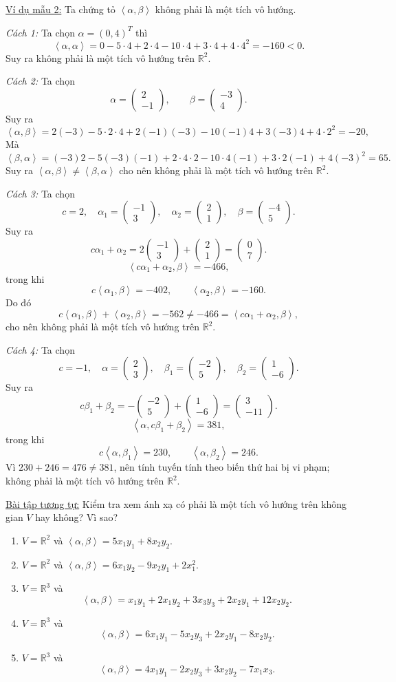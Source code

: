 \documentclass[12pt,a4paper]{article}
\newcommand{\R}{\mathbb{R}}
\newcommand{\ip}[2]{\left\langle #1,#2\right\rangle}
\newcommand{\vect}[1]{\begin{pmatrix}#1\end{pmatrix}}
\begin{document}
\underline{Ví dụ mẫu 2:} Ta chứng tỏ $\ip{\alpha}{\beta}$ không phải là một tích vô hướng.

\textit{Cách 1:} Ta chọn $\alpha=(0,4)^T$ thì
\[
\ip{\alpha}{\alpha}=0-5\cdot4+2\cdot4-10\cdot4+3\cdot4+4\cdot4^2=-160<0.
\]
Suy ra không phải là một tích vô hướng trên $\R^2$.

\textit{Cách 2:} Ta chọn
\[
\alpha=\vect{2\\-1},\qquad \beta=\vect{-3\\4}.
\]
Suy ra
\[
\ip{\alpha}{\beta}=2(-3)-5\cdot2\cdot4+2(-1)(-3)-10(-1)4+3(-3)4+4\cdot2^2=-20,
\]
Mà
\[
\ip{\beta}{\alpha}=(-3)2-5(-3)(-1)+2\cdot4\cdot2-10\cdot4(-1)+3\cdot2(-1)+4(-3)^2=65.
\]
Suy ra $\ip{\alpha}{\beta}\ne\ip{\beta}{\alpha}$ cho nên không phải là một tích vô hướng trên $\R^2$.

\textit{Cách 3:} Ta chọn
\[
c=2,\quad \alpha_1=\vect{-1\\3},\quad \alpha_2=\vect{2\\1},\quad \beta=\vect{-4\\5}.
\]
Suy ra
\[
c\alpha_1+\alpha_2=2\vect{-1\\3}+\vect{2\\1}=\vect{0\\7}.
\]
\[
\ip{c\alpha_1+\alpha_2}{\beta}=-466,
\]
trong khi
\[
c\ip{\alpha_1}{\beta}=-402,\qquad \ip{\alpha_2}{\beta}=-160.
\]
Do đó
\[
c\ip{\alpha_1}{\beta}+\ip{\alpha_2}{\beta}=-562\ne-466=\ip{c\alpha_1+\alpha_2}{\beta},
\]
cho nên không phải là một tích vô hướng trên $\R^2$.

\textit{Cách 4:} Ta chọn
\[
c=-1,\quad \alpha=\vect{2\\3},\quad \beta_1=\vect{-2\\5},\quad \beta_2=\vect{1\\-6}.
\]
Suy ra
\[
c\beta_1+\beta_2=-\vect{-2\\5}+\vect{1\\-6}=\vect{3\\-11}.
\]
\[
\ip{\alpha}{c\beta_1+\beta_2}=381,
\]
trong khi
\[
c\ip{\alpha}{\beta_1}=230,\qquad \ip{\alpha}{\beta_2}=246.
\]
Vì $230+246=476\ne381$, nên tính tuyến tính theo biến thứ hai bị vi phạm; không phải là một tích vô hướng trên $\R^2$.

\underline{Bài tập tương tự:} Kiểm tra xem ánh xạ có phải là một tích vô hướng trên không gian $V$ hay không? Vì sao?
\begin{enumerate}[label=\alph*/]
\item $V=\R^2$ và $\ip{\alpha}{\beta}=5x_1y_1+8x_2y_2$.
\item $V=\R^2$ và $\ip{\alpha}{\beta}=6x_1y_2-9x_2y_1+2x_1^2$.
\item $V=\R^3$ và
\[
\ip{\alpha}{\beta}=x_1y_1+2x_1y_2+3x_3y_3+2x_2y_1+12x_2y_2.
\]
\item $V=\R^3$ và
\[
\ip{\alpha}{\beta}=6x_1y_1-5x_2y_3+2x_2y_1-8x_2y_2.
\]
\item $V=\R^3$ và
\[
\ip{\alpha}{\beta}=4x_1y_1-2x_2y_3+3x_2y_2-7x_1x_3.
\]
\end{enumerate}
\end{document}
